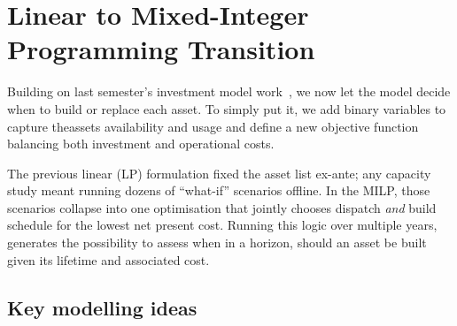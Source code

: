 \newpage
\section{Linear to Mixed-Integer Programming Transition}
\label{sec:MILP_transition}
Building on last semester's investment model work~\cite{vierui2024vt1}, we now let the
model decide when to build or replace each asset.  To simply put it, we add binary variables 
to capture theassets availability and usage and define a new objective function 
balancing both investment and operational costs.

The previous linear (LP) formulation fixed the asset list ex-ante; any capacity
study meant running dozens of “what-if” scenarios offline.  In the MILP,
those scenarios collapse into one optimisation that jointly chooses
dispatch \emph{and} build schedule for the lowest net present cost. Running this logic over
multiple years, generates the possibility to assess when in a horizon, should an asset be built 
given its lifetime and associated cost.

\subsection{Key modelling ideas}
\label{ssec:MILP_methodology}

